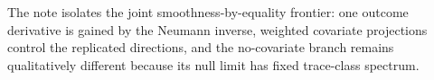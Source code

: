 The note isolates the joint smoothness-by-equality frontier: one outcome derivative is gained by the Neumann inverse, weighted covariate projections control the replicated directions, and the no-covariate branch remains qualitatively different because its null limit has fixed trace-class spectrum.